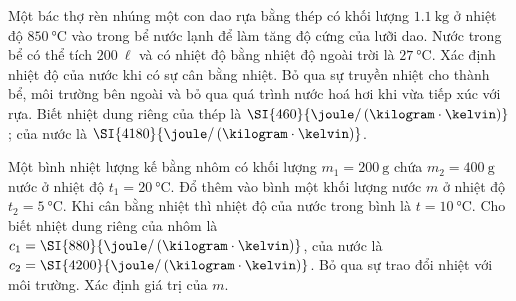 \begin{vd}
		Một bác thợ rèn nhúng một con dao rựa bằng thép có khối lượng $\SI{1.1}{\kilogram}$ ở nhiệt độ $\SI{850}{\celsius}$ vào trong bể nước lạnh để làm tăng độ cứng của lưỡi dao. Nước trong bể có thể tích $\SI{200}{\ell}$ và có nhiệt độ bằng nhiệt độ ngoài trời là $\SI{27}{\celsius}$. Xác định nhiệt độ của nước khi có sự cân bằng nhiệt. Bỏ qua sự truyền nhiệt cho thành bể, môi trường bên ngoài và bỏ qua quá trình nước hoá hơi khi vừa tiếp xúc với rựa. Biết nhiệt dung riêng của thép là $\SI{460}{\joule/\left(\kilogram\cdot\kelvin\right)}$; của nước là $\SI{4180}{\joule/\left(\kilogram\cdot\kelvin\right)}$.
\end{vd}
	
\begin{vd}
Một bình nhiệt lượng kế bằng nhôm có khối lượng $m_1=\SI{200}{\gram}$ chứa $m_2=\SI{400}{\gram}$ nước ở nhiệt độ $t_1=\SI{20}{\celsius}$. Đổ thêm vào bình một khối lượng nước $m$ ở nhiệt độ $t_2=\SI{5}{\celsius}$. Khi cân bằng nhiệt thì nhiệt độ của nước trong bình là $t=\SI{10}{\celsius}$. Cho biết nhiệt dung riêng của nhôm là $c_1=\SI{880}{\joule/\left(\kilogram\cdot\kelvin\right)}$, của nước là $c_2=\SI{4200}{\joule/\left(\kilogram\cdot\kelvin\right)}$. Bỏ qua sự trao đổi nhiệt với môi trường. Xác định giá trị của $m$.
\end{vd}
